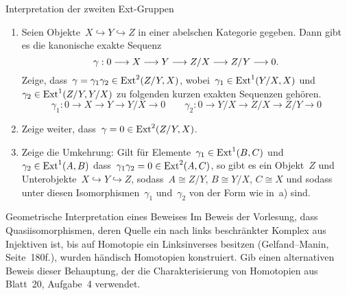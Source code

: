 \documentclass{uebblatt}
\begin{document}
\begin{aufgabe}{Interpretation der zweiten Ext-Gruppen}
\begin{enumerate}
\item Seien Objekte~$X \hookrightarrow Y \hookrightarrow Z$ in einer abelschen
Kategorie gegeben. Dann gibt es die kanonische exakte Sequenz
\[ \gamma : 0 \longrightarrow X \longrightarrow Y \longrightarrow Z/X \longrightarrow Z/Y \longrightarrow 0. \]
Zeige, dass~$\gamma = \gamma_1 \gamma_2 \in \mathrm{Ext}^2(Z/Y,X)$, wobei~$\gamma_1 \in
\mathrm{Ext}^1(Y/X,X)$ und $\gamma_2 \in \mathrm{Ext}^1(Z/Y,Y/X)$ zu folgenden kurzen exakten
Sequenzen gehören.
\[ \gamma_1 : 0 \to X \to Y \to Y/X \to 0 \qquad
  \gamma_2 : 0 \to Y/X \to Z/X \to Z/Y \to 0 \]
\item Zeige weiter, dass~$\gamma = 0 \in \mathrm{Ext}^2(Z/Y,X)$.
\item Zeige die Umkehrung: Gilt für Elemente~$\gamma_1 \in \mathrm{Ext}^1(B,C)$ und
$\gamma_2 \in \mathrm{Ext}^1(A,B)$ dass~$\gamma_1 \gamma_2 = 0 \in \mathrm{Ext}^2(A,C)$, so
gibt es ein Objekt~$Z$ und Unterobjekte~$X \hookrightarrow Y \hookrightarrow
Z$, sodass~$A \cong Z/Y$, $B \cong Y/X$, $C \cong X$ und sodass unter diesen
Isomorphismen~$\gamma_1$ und~$\gamma_2$ von der Form wie in~a) sind.
\end{enumerate}
\end{aufgabe}

\newpage

\begin{aufgabe}{Geometrische Interpretation eines Beweises}
Im Beweis der Vorlesung, dass Quasiisomorphismen, deren Quelle ein nach links
beschränkter Komplex aus Injektiven ist, bis auf Homotopie ein Linksinverses
besitzen (Gelfand--Manin, Seite~180f.), wurden händisch Homotopien konstruiert.
Gib einen alternativen Beweis dieser Behauptung, der die
Charakterisierung von Homotopien aus Blatt~20, Aufgabe~4 verwendet.
\end{aufgabe}
\end{document}
